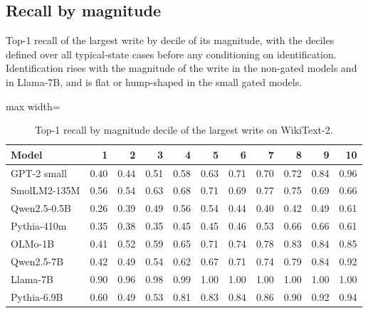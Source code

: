 \subsection{Recall by magnitude}\label{app:recall-decile}
Top-1 recall of the largest write by decile of its magnitude, with the deciles defined over all typical-state cases before any conditioning on identification. Identification rises with the magnitude of the write in the non-gated models and in Llama-7B, and is flat or hump-shaped in the small gated models.
\begin{table}[H]\centering\scriptsize
\caption{Top-1 recall by magnitude decile of the largest write on WikiText-2.}\label{app:recall-decile-wikitext}
\begin{adjustbox}{max width=\linewidth}
\begin{tabular}{lrrrrrrrrrr}\toprule
Model & 1 & 2 & 3 & 4 & 5 & 6 & 7 & 8 & 9 & 10 \\ \midrule
GPT-2 small & 0.40 & 0.44 & 0.51 & 0.58 & 0.63 & 0.71 & 0.70 & 0.72 & 0.84 & 0.96 \\
SmolLM2-135M & 0.56 & 0.54 & 0.63 & 0.68 & 0.71 & 0.69 & 0.77 & 0.75 & 0.69 & 0.66 \\
Qwen2.5-0.5B & 0.26 & 0.39 & 0.49 & 0.56 & 0.54 & 0.44 & 0.40 & 0.42 & 0.49 & 0.61 \\
Pythia-410m & 0.35 & 0.38 & 0.35 & 0.45 & 0.45 & 0.46 & 0.53 & 0.66 & 0.66 & 0.61 \\
OLMo-1B & 0.41 & 0.52 & 0.59 & 0.65 & 0.71 & 0.74 & 0.78 & 0.83 & 0.84 & 0.85 \\
Qwen2.5-7B & 0.42 & 0.49 & 0.54 & 0.62 & 0.67 & 0.71 & 0.74 & 0.79 & 0.84 & 0.92 \\
Llama-7B & 0.90 & 0.96 & 0.98 & 0.99 & 1.00 & 1.00 & 1.00 & 1.00 & 1.00 & 1.00 \\
Pythia-6.9B & 0.60 & 0.49 & 0.53 & 0.81 & 0.83 & 0.84 & 0.86 & 0.90 & 0.92 & 0.94 \\
\bottomrule\end{tabular}\end{adjustbox}
\end{table}
